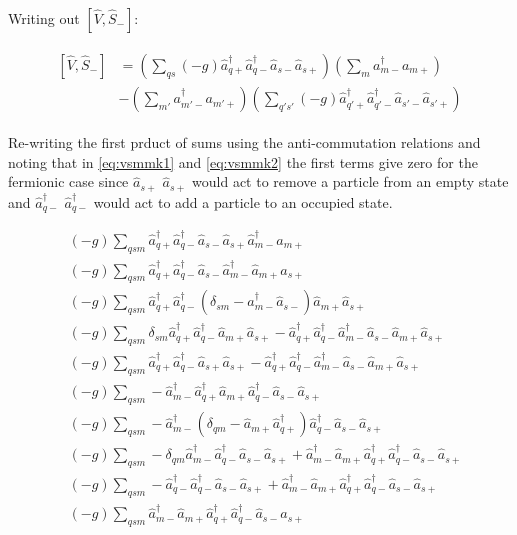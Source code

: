 \documentclass[11pt]{article}
\newcommand{\cop}[2]{%
	\ensuremath{ \hat{a} _{#1 #2} ^{\dagger} }}
\newcommand{\aop}[2]{%
	\ensuremath{ \hat{a} _{#1 #2} }}
\newcommand{\sminus}[1]{%
	\ensuremath{ \sum_{#1}  a _{#1 -} ^{\dagger} a _{#1 +} } }
\newcommand{\twobody}[2]{%
	\ensuremath{ \sum_{#1 #2} (-g) \cop{#1}{+} \cop{#1}{-} \aop{#2}{-} \aop{#2}{+}  } }
\newcommand{\sop}[1]{%
	\ensuremath{ \hat{S}_{#1} } }
\newcommand{\krondelt}[2]{%
	\ensuremath{ \delta _{#1 #2} }}
\newcommand{\vop}{
	\ensuremath{ \hat{V} } }
\newcommand{\commutator}[2]{%
	\ensuremath{ \left [ #1,#2 \right ] }}
\begin{document}
Writing out \commutator{\vop}{\sop{-}}:

\begin{align}
\begin{split}
	\commutator{\vop}{\sop{-}} &= \left ( \twobody{q}{s} \right ) \left ( \sminus{m} \right )\\
	& - \left ( \sminus{m'} \right ) \left ( \twobody{q'}{s'} \right )
\end{split}
\label{eq:vsminus}
\end{align}
	
Re-writing the first prduct of sums using the anti-commutation relations and noting that in \ref{eq:vsmmk1} and \ref{eq:vsmmk2} the first terms give zero for the fermionic case since \aop{s}{+} \aop{s}{+} would act to remove a particle from an empty state and \cop{q}{-} \cop{q}{-} would act to add a particle to an occupied state.

\begin{align}
	& (-g) \sum _{q s m} \cop{q}{+} \cop{q}{-} \aop{s}{-} \aop{s}{+} \cop{m}{-} \aop{m}{+}\\
	& (-g) \sum _{q s m} \cop{q}{+} \cop{q}{-} \aop{s}{-} \cop{m}{-} \aop{m}{+} \aop{s}{+}\\
	& (-g) \sum _{q s m} \cop{q}{+} \cop{q}{-} \left ( \krondelt{s}{m} - \cop{m}{-} \aop{s}{-} \right ) \aop{m}{+} \aop{s}{+}\\
	& (-g) \sum _{q s m} \krondelt{s}{m} \cop{q}{+} \cop{q}{-} \aop{m}{+} \aop{s}{+} - \cop{q}{+} \cop{q}{-} \cop{m}{-} \aop{s}{-} \aop{m}{+} \aop{s}{+}\\
\label{eq:vsmmk1}	& (-g) \sum _{q s m} \cop{q}{+} \cop{q}{-} \aop{s}{+} \aop{s}{+} - \cop{q}{+} \cop{q}{-} \cop{m}{-} \aop{s}{-} \aop{m}{+} \aop{s}{+}\\
	& (-g) \sum _{q s m} - \cop{m}{-} \cop{q}{+} \aop{m}{+} \cop{q}{-} \aop{s}{-} \aop{s}{+}\\
	& (-g) \sum _{q s m} - \cop{m}{-} \left ( \krondelt{q}{m} - \aop{m}{+} \cop{q}{+} \right ) \cop{q}{-} \aop{s}{-} \aop{s}{+}\\
	& (-g) \sum _{q s m} - \krondelt{q}{m}\cop{m}{-} \cop{q}{-} \aop{s}{-} \aop{s}{+} + \cop{m}{-}  \aop{m}{+} \cop{q}{+} \cop{q}{-} \aop{s}{-} \aop{s}{+}\\
\label{eq:vsmmk2}	& (-g) \sum _{q s m} - \cop{q}{-} \cop{q}{-} \aop{s}{-} \aop{s}{+} + \cop{m}{-}  \aop{m}{+} \cop{q}{+} \cop{q}{-} \aop{s}{-} \aop{s}{+}\\
\label{eq:vsmres}	& (-g) \sum _{q s m} \cop{m}{-}  \aop{m}{+} \cop{q}{+} \cop{q}{-} \aop{s}{-} \aop{s}{+}
\end{align}
\end{document}
